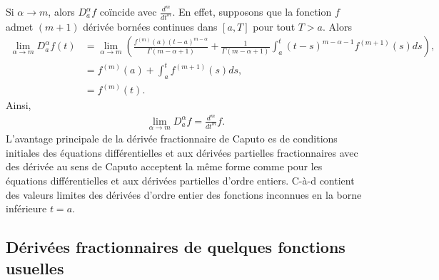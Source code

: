 \vspace{0.5cm}
\begin{remarque}
    Si $\alpha \to m$, alors $D_a^{\alpha}f$ coïncide avec $\frac{d^m}{dt^m}$.
    En effet, supposons que la fonction $f$ admet $(m+1)$ dérivée bornées continues dans $[a,T]$ pour tout $T>a$. Alors
    \begin{align*}
        \lim_{\alpha\to m} D_a^{\alpha} f(t) &= \lim_{\alpha \to m} \left(\frac{f^{(m)}(a)(t-a)^{m-\alpha}}{\Gamma(m-\alpha+1)} +\frac{1}{\Gamma(m-\alpha + 1)}\int_a^t (t-s)^{m-\alpha-1} f^{(m+1)} (s)ds \right),\\
        &= f^{(m)}(a) +\int_a^t f^{(m+1)}(s)ds,\\
        &= f^{(m)} (t).
    \end{align*}
    Ainsi,
    \begin{align*}
        \lim_{\alpha \to m} D_a^{\alpha} f =\frac{d^m}{dt^m}f.
    \end{align*}
    L'avantage principale de la dérivée fractionnaire de Caputo es de conditions initiales des équations différentielles et aux dérivées partielles fractionnaires avec des dérivée au sens de Caputo acceptent la même forme comme pour les équations différentielles et aux dérivées partielles d'ordre entiers. C-à-d contient des valeurs limites des dérivées d'ordre entier des fonctions inconnues en la borne inférieure $t=a$.
\end{remarque}

\subsection{Dérivées fractionnaires de quelques fonctions usuelles}
